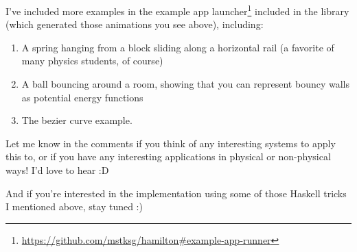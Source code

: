 \documentclass[]{article}
\renewcommand{\href}[2]{#2\footnote{\url{#1}}}
\begin{document}
I've included more examples in the
\href{https://github.com/mstksg/hamilton\#example-app-runner}{example app
launcher} included in the library (which generated those animations you see
above), including:

\begin{enumerate}
\tightlist
\item
  A spring hanging from a block sliding along a horizontal rail (a favorite of
  many physics students, of course)
\item
  A ball bouncing around a room, showing that you can represent bouncy walls as
  potential energy functions
\item
  The bezier curve example.
\end{enumerate}

Let me know in the comments if you think of any interesting systems to apply
this to, or if you have any interesting applications in physical or non-physical
ways! I'd love to hear :D

And if you're interested in the implementation using some of those Haskell
tricks I mentioned above, stay tuned :)
\end{document}
